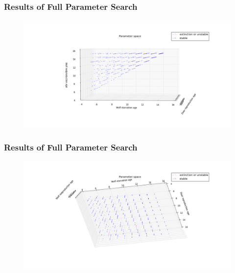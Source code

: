 \documentclass{beamer}
\begin{document}
\frame
{
  \frametitle{Results of Full Parameter Search}
  \begin{figure}[H]
	\includegraphics[width = 1\textwidth]{./pics/Eco_All_param_wage_v_wstarve.png}
  \end{figure}
}
                
\frame
{
  \frametitle{Results of Full Parameter Search}
  \begin{figure}[H]
	\includegraphics[width = 1\textwidth]{./pics/Eco_All_param_wstarve_v_drep.png}
  \end{figure}

}
\end{document}
